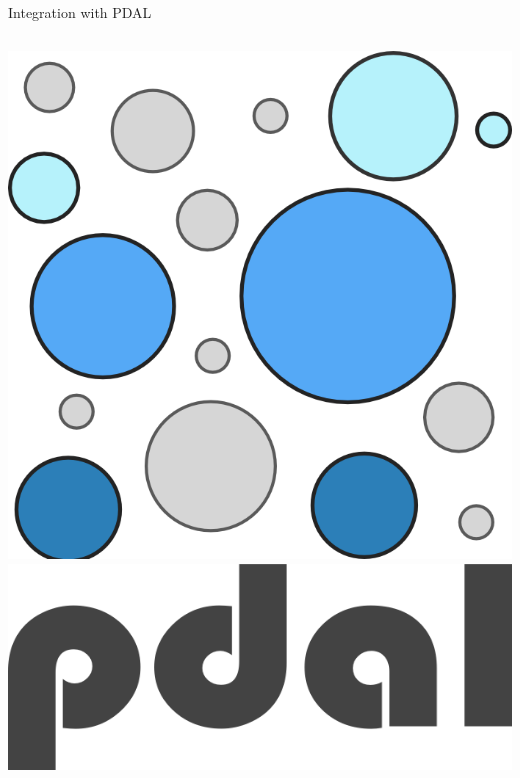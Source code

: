 \documentclass[xcolor={dvipsnames,usenames},beamer,aspectratio=169]{beamer}
\begin{document}
\begin{frame}{Integration with PDAL}
\begin{columns}
\begin{column}{0.25\textwidth}
\begin{center}
  \includegraphics[width=\textwidth]{logos/pdal_bubbles}\\
  \includegraphics[width=\textwidth]{logos/pdal_text}
\end{center}

\end{column}
\end{columns}

\end{frame}
\end{document}
